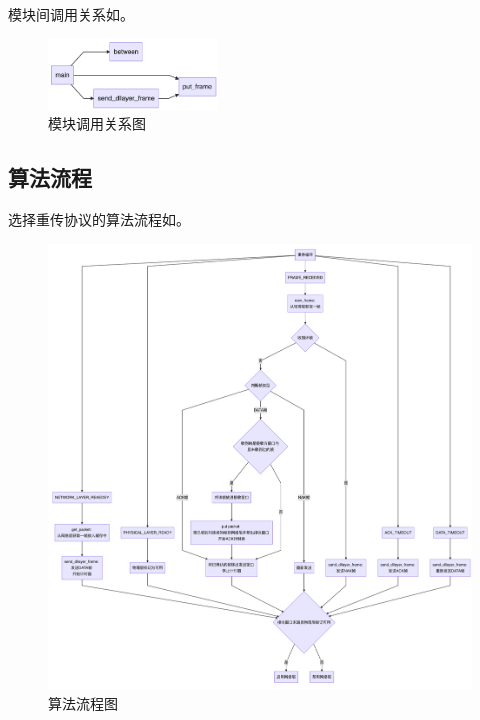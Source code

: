 \documentclass[lang=cn,11pt,a4paper,cite=authornum]{paper}
\begin{document}
模块间调用关系如。

\begin{figure}[htbp]
    
    \centering\includegraphics[width=0.4\textwidth]{./Images/img2.png}

    \caption{模块调用关系图\label{fig:img2}}

\end{figure}

\subsection{算法流程}

选择重传协议的算法流程如。

\begin{figure}[htbp]
    
    \centering\includegraphics[width=\textwidth]{./Images/img3.png}

    \caption{算法流程图\label{fig:img3}}

\end{figure}
\end{document}
